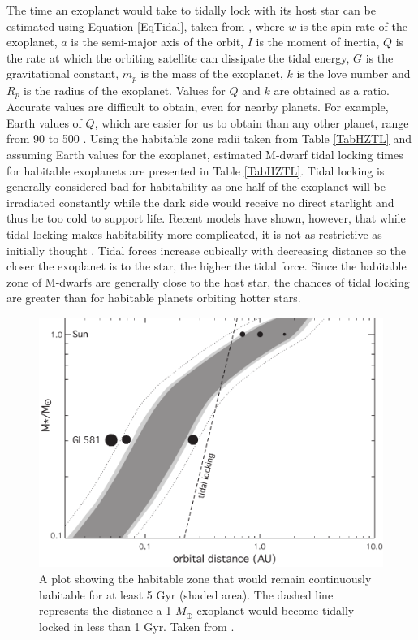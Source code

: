 The time an exoplanet would take to tidally lock with its host star can be estimated using Equation \ref{EqTidal}, taken from \citet{1977Peale}, where $w$ is the spin rate of the exoplanet, $a$ is the semi-major axis of the orbit, $I$ is the moment of inertia, $Q$ is the rate at which the orbiting satellite can dissipate the tidal energy, $G$ is the gravitational constant, $m_p$ is the mass of the exoplanet, $k$ is the love number and $R_p$ is the radius of the exoplanet. Values for $Q$ and $k$ are obtained as a ratio. Accurate values are difficult to obtain, even for nearby planets. For example, Earth values of $Q$, which are easier for us to obtain than any other planet, range from 90 to 500 \citep{1996Ray}. Using the habitable zone radii taken from Table \ref{TabHZTL} and assuming Earth values for the exoplanet, estimated M-dwarf tidal locking times for habitable exoplanets are presented in Table \ref{TabHZTL}. Tidal locking is generally considered bad for habitability as one half of the exoplanet will be irradiated constantly while the dark side would receive no direct starlight and thus be too cold to support life. Recent models have shown, however, that while tidal locking makes habitability more complicated, it is not as restrictive as initially thought \citep{2013Yang}. Tidal forces increase cubically with decreasing distance so the closer the exoplanet is to the star, the higher the tidal force. Since the habitable zone of M-dwarfs are generally close to the host star, the chances of tidal locking are greater than for habitable planets orbiting hotter stars.\\
\begin{figure}
\centering
\includegraphics[width=\textwidth]{8091fig3.pdf}
\caption{A plot showing the habitable zone that would remain continuously habitable for at least 5 Gyr (shaded area). The dashed line represents the distance a 1 $M_{\oplus}$ exoplanet would become tidally locked in less than 1 Gyr. Taken from \citet{2007Selsis}.}
\label{FigTidalHZ}
\end{figure}
